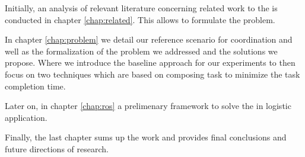 Initially, an analysis of relevant literature concerning related work to the \mrs 
is conducted in chapter \ref{chap:related}. This allows to formulate the problem.

In chapter \ref{chap:problem} we detail our reference scenario for \mrs coordination and 
well as the formalization of the problem we addressed and the solutions we propose.
Where we introduce the baseline approach for our experiments to then focus on two techniques
which are based on composing task to minimize the task completion time.

Later on, in chapter \ref{chap:ros} a prelimenary framework to solve the \mrs in logistic 
application. 

Finally, the last chapter sums up the work and provides final conclusions and future
directions of research.





